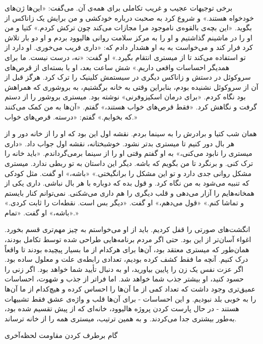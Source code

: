 برخی توجیهات عجیب و غریب تکاملی برای همه‌ی آن. می‌گفت: «این‌ها ژن‌های خودخواه هستند.»  
و شروع کرد به صحبت درباره خودکشی و من برایش یک زاناکس از  
بگوید. «این بچه‌ی بالقوه‌ی ناموجود مرا مجازات می‌کند چون ترکش کردم.»  
کتیا و من او را در ماشینم گذاشتیم و او را به مرکز  
سلامت روانی هالیوود بردم و او دو بار تلاش کرد فرار کند و می‌خواست به  
به او هشدار دادم که: «داری فریب می‌خوری. او دارد از تو استفاده می‌کند تا از میستری انتقام بگیرد.»  
او گفت: «نه، درست نیست. ما برای همدیگر احساسات واقعی داریم.»  
شش ساعت بعد، او با بسته‌ای از قرص‌های سروکوئل در  
دستش و زاناکس دیگری در سیستمش کلینیک را ترک کرد. هرگز قبل از آن از سروکوئل نشنیده بودم،  
بنابراین وقتی به خانه برگشتیم، به بروشوری که همراهش بود نگاه کردم.  
«برای درمان اسکیزوفرنی» نوشته بود.  
میستری بروشور را از دستم گرفت و نگاهش کرد. «فقط قرص‌های خواب هستند،»  
گفتم. «آن‌ها به من کمک می‌کنند که بخوابم.»  
گفتم: «درسته. قرص‌های خواب.»

همان شب کتیا و برادرش را به سینما بردم. نقشه اول این بود که  
او را از خانه دور و از هر بال دور کنیم تا میستری بدتر نشود.  
خوشبختانه، نقشه اول جواب داد.  
«داری میستری را نابود می‌کنی،» به او گفتم وقتی او را از  
سینما برمی‌گرداندم. «باید خانه را ترک کنی. و برنگرد تا من بگویم که  
باشه. دیگر این داستان به تو ربطی ندارد. میستری مشکل روانی  
جدی دارد و تو این مشکل را برانگیختی.»  
«باشه،» او گفت. مثل کودکی که تنبیه می‌شود به من نگاه کرد.  
و قول بده که دوباره با هر بال نباشی. داری یکی از  
همخانه‌هایم را آزار می‌دهی و قلب دیگری را هم داری می‌شکنی. نمی‌توانم  
کنار بایستم و تماشا کنم.»  
«قول می‌دهم،» او گفت.  
«دیگر بس است. نقطه‌ات را ثابت کردی.»  
«باشه،» او گفت. «تمام.»

انگشت‌های صورتی را قفل کردیم.  
باید از او می‌خواستم به چیز مهم‌تری قسم بخورد.  
اغواء آسان‌تر از این بود. حتی اگر مردم برنامه‌هایی  
طراحی شده توسط تکامل بودند، همان‌طور که میستری معتقد بود،  
آن‌ها برای هرکدام از ما بسیار پیچیده بودند تا واقعاً درک کنیم.  
آنچه ما فقط کشف کرده بودیم، تعدادی رابطه‌ی علت و معلول ساده بود.  
اگر عزت نفس یک زن را پایین بیاورید، او به دنبال  
تأیید شما خواهد بود. اگر زنی را حسود کنید، او  
بیشتر جذب شما خواهد شد. اما فراتر از جذب و شهوت،  
احساسات عمیق‌تری وجود داشت که تعداد کمی از ما  
آن‌ها را احساس کرده و هیچ‌کدام از ما آن‌ها را به خوبی بلد نبودیم.  
و این احساسات - برای آن‌ها قلب و واژه‌ی عشق فقط  
تشبیهات هستند - در حال پارست کردن پروژه هالیوود، خانه‌ای که از  
پیش تقسیم شده بود، به‌طور بیشتری جدا می‌کردند.  
و به همین ترتیب، میستری همه را از خانه ترساند.

گام   
برطرف کردن مقاومت لحظه‌آخری

